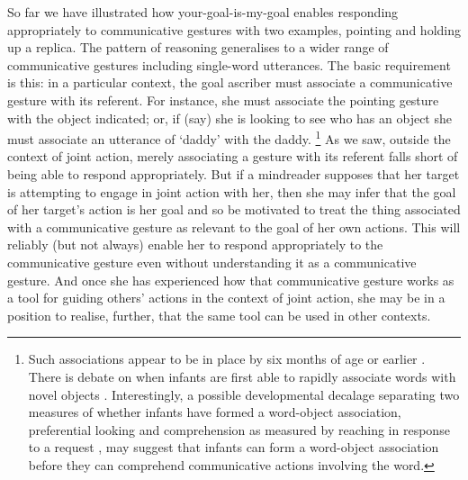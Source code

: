 \documentclass[12pt,\papersize]{extarticle}
\begin{document}
So far we have illustrated how your-goal-is-my-goal enables responding appropriately to communicative gestures with two examples, pointing and holding up a replica.
The pattern of reasoning generalises to a wider range of communicative gestures including single-word utterances.
The basic requirement is this: in a particular context, the goal ascriber must associate a communicative gesture with its referent.
For instance, she must associate the pointing gesture with the object indicated; or, if (say) she is looking to see who has an object she must associate an utterance of `daddy' with the daddy.%
\footnote{
Such associations appear to be in place by six months of age or earlier \citep{tincoff:1999_beginnings_,tincoff:2011}.
There is debate on when infants are first able to rapidly associate words with novel objects \citep{werker:1998_acquisition,friedrich:2011_word_}.
Interestingly,
a possible developmental decalage separating 
two measures of whether infants have formed a word-object association,
preferential looking and comprehension as measured by reaching in response to a request  \citep{gurteen:2011_rapid},
may suggest that
infants can form a word-object association before they can comprehend communicative actions involving the word.
}
As we saw, 
outside the context of joint action,
merely associating a gesture with its referent falls short of being able to respond appropriately.
But if a mindreader supposes that her target is attempting to engage in joint action with her,
then she may infer that the goal of her target's action is her goal
and so be motivated to treat the thing associated with a communicative gesture as relevant to the goal of her own actions.
This will reliably (but not always) enable her to respond appropriately to the communicative gesture even without understanding it as a communicative gesture.
And once she has experienced how that communicative gesture works as a tool for guiding others' actions in the context of joint action,
she may be in a position to realise, further, that the same tool can be used in other contexts.
\end{document}
